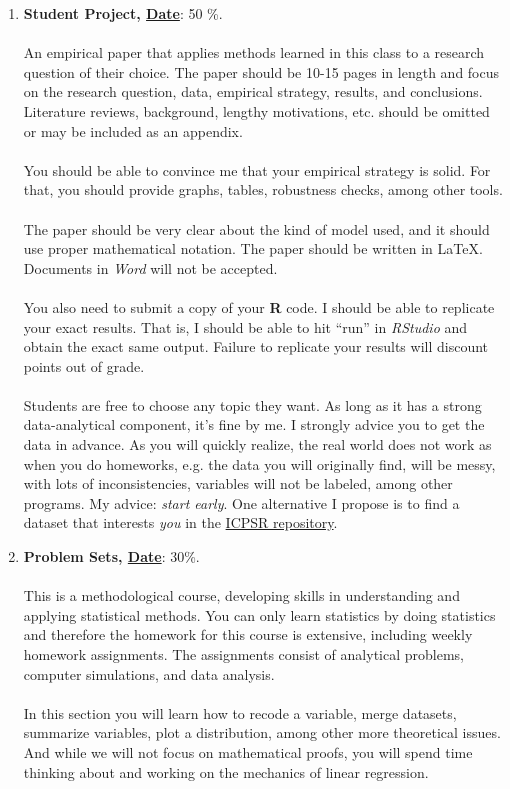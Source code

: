 \documentclass[letterpaper]{article}
\begin{document}
\begin{enumerate}

	\item {\bf Student Project, \underline{Date}}: 50 \%. 
	\\
	\\
	An empirical paper that applies methods learned in this class to a research question of their choice. The paper should be 10-15 pages in length and focus on the research question, data, empirical strategy, results, and conclusions. Literature reviews, background, lengthy motivations, etc. should be omitted or may be included as an appendix. 
	\\
	\\
	You should be able to convince me that your empirical strategy is solid. For that, you should provide graphs, tables, robustness checks, among other tools. 
	\\
	\\
	The paper should be very clear about the kind of model used, and it should use proper mathematical notation. The paper should be written in \LaTeX. Documents in \emph{Word} will not be accepted.
	\\
	\\
	You also need to submit a copy of your {\bf R} code. I should be able to replicate your exact results. That is, I should be able to hit ``run'' in \emph{RStudio} and obtain the exact same output. Failure to replicate your results will discount points out of grade.
	\\
	\\
	Students are free to choose any topic they want. As long as it has a strong data-analytical component, it's fine by me. I strongly advice you to get the data in advance. As you will quickly realize, the real world does not work as when you do homeworks, e.g. the data you will originally find, will be messy, with lots of inconsistencies, variables will not be labeled, among other programs. My advice: \emph{start early}. One alternative I propose is to find a dataset that interests \emph{you} in the \href{https://www.icpsr.umich.edu/icpsrweb/ICPSR/access/subject.jsp}{ICPSR repository}.


	\item {\bf Problem Sets, \underline{Date}}: 30\%. 
	\\
	\\
	This is a methodological course, developing skills in understanding and applying statistical methods. You can only learn statistics by doing statistics and therefore the homework for this course is extensive, including weekly homework assignments. The assignments consist of analytical problems, computer simulations, and data analysis. 
	\\
	\\
	In this section you will learn how to recode a variable, merge datasets, summarize variables, plot a distribution, among other more theoretical issues. And while we will not focus on mathematical proofs, you will spend time thinking about and working on the mechanics of linear regression.



\end{enumerate}
\end{document}
